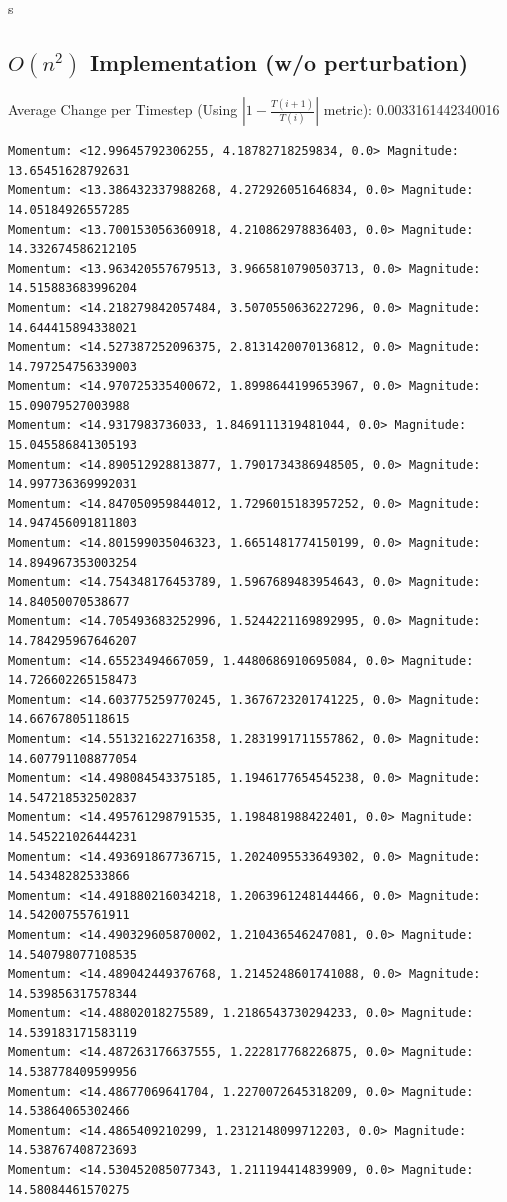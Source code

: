 s\documentclass[10pt]{article}
\begin{document}
\subsection{$O(n^2)$ Implementation (w/o perturbation)}
Average Change per Timestep (Using $|1 - \frac{T(i+1)}{T(i)}|$ metric): 0.0033161442340016
\footnotesize
\begin{verbatim}
Momentum: <12.99645792306255, 4.18782718259834, 0.0> Magnitude: 13.65451628792631
Momentum: <13.386432337988268, 4.272926051646834, 0.0> Magnitude: 14.05184926557285
Momentum: <13.700153056360918, 4.210862978836403, 0.0> Magnitude: 14.332674586212105
Momentum: <13.963420557679513, 3.9665810790503713, 0.0> Magnitude: 14.515883683996204
Momentum: <14.218279842057484, 3.5070550636227296, 0.0> Magnitude: 14.644415894338021
Momentum: <14.527387252096375, 2.8131420070136812, 0.0> Magnitude: 14.797254756339003
Momentum: <14.970725335400672, 1.8998644199653967, 0.0> Magnitude: 15.09079527003988
Momentum: <14.9317983736033, 1.8469111319481044, 0.0> Magnitude: 15.045586841305193
Momentum: <14.890512928813877, 1.7901734386948505, 0.0> Magnitude: 14.997736369992031
Momentum: <14.847050959844012, 1.7296015183957252, 0.0> Magnitude: 14.947456091811803
Momentum: <14.801599035046323, 1.6651481774150199, 0.0> Magnitude: 14.894967353003254
Momentum: <14.754348176453789, 1.5967689483954643, 0.0> Magnitude: 14.84050070538677
Momentum: <14.705493683252996, 1.5244221169892995, 0.0> Magnitude: 14.784295967646207
Momentum: <14.65523494667059, 1.4480686910695084, 0.0> Magnitude: 14.726602265158473
Momentum: <14.603775259770245, 1.3676723201741225, 0.0> Magnitude: 14.66767805118615
Momentum: <14.551321622716358, 1.2831991711557862, 0.0> Magnitude: 14.607791108877054
Momentum: <14.498084543375185, 1.1946177654545238, 0.0> Magnitude: 14.547218532502837
Momentum: <14.495761298791535, 1.198481988422401, 0.0> Magnitude: 14.545221026444231
Momentum: <14.493691867736715, 1.2024095533649302, 0.0> Magnitude: 14.54348282533866
Momentum: <14.491880216034218, 1.2063961248144466, 0.0> Magnitude: 14.54200755761911
Momentum: <14.490329605870002, 1.210436546247081, 0.0> Magnitude: 14.540798077108535
Momentum: <14.489042449376768, 1.2145248601741088, 0.0> Magnitude: 14.539856317578344
Momentum: <14.48802018275589, 1.2186543730294233, 0.0> Magnitude: 14.539183171583119
Momentum: <14.487263176637555, 1.222817768226875, 0.0> Magnitude: 14.538778409599956
Momentum: <14.48677069641704, 1.2270072645318209, 0.0> Magnitude: 14.53864065302466
Momentum: <14.4865409210299, 1.2312148099712203, 0.0> Magnitude: 14.538767408723693
Momentum: <14.530452085077343, 1.211194414839909, 0.0> Magnitude: 14.58084461570275

\end{verbatim}
\end{document}
